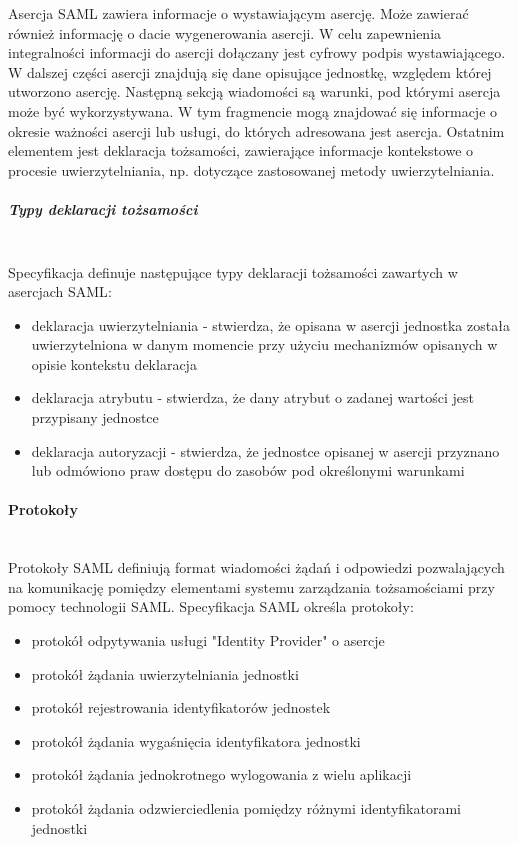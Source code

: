 				Asercja SAML zawiera informacje o wystawiającym asercję. Może zawierać również informację o dacie wygenerowania asercji. W celu zapewnienia integralności informacji do asercji dołączany jest cyfrowy podpis wystawiającego. W dalszej części asercji znajdują się dane opisujące jednostkę, względem której utworzono asercję. Następną sekcją wiadomości są warunki, pod którymi asercja może być wykorzystywana. W tym fragmencie mogą znajdować się informacje o okresie ważności asercji lub usługi, do których adresowana jest asercja. Ostatnim elementem jest deklaracja tożsamości, zawierające informacje kontekstowe o procesie uwierzytelniania, np. dotyczące zastosowanej metody uwierzytelniania.

			\subparagraph{Typy deklaracji tożsamości}\mbox{}\\

				Specyfikacja definuje następujące typy deklaracji tożsamości zawartych w asercjach SAML\cite{Wisniewski05}:

				\begin{itemize}
				  \item deklaracja uwierzytelniania - stwierdza, że opisana w asercji jednostka została uwierzytelniona w danym momencie przy użyciu mechanizmów opisanych w opisie kontekstu deklaracja
				  \item deklaracja atrybutu - stwierdza, że dany atrybut o zadanej wartości jest przypisany jednostce
				  \item deklaracja autoryzacji - stwierdza, że jednostce opisanej w asercji przyznano lub odmówiono praw dostępu do zasobów pod określonymi warunkami
				 \end{itemize}

		\paragraph{Protokoły}\mbox{}\\ 

			Protokoły SAML definiują format wiadomości żądań i odpowiedzi pozwalających na komunikację pomiędzy elementami systemu zarządzania tożsamościami przy pomocy technologii SAML. Specyfikacja SAML określa protokoły:

			\begin{itemize}
			  \item protokół odpytywania usługi "Identity Provider" o asercje
			  \item protokół żądania uwierzytelniania jednostki
			  \item protokół rejestrowania identyfikatorów jednostek
			  \item protokół żądania wygaśnięcia identyfikatora jednostki
			  \item protokół żądania jednokrotnego wylogowania z wielu aplikacji
			  \item protokół żądania odzwierciedlenia pomiędzy różnymi identyfikatorami jednostki
			\end{itemize}

